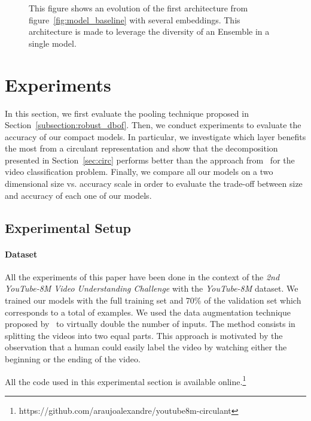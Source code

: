 \documentclass[runningheads]{llncs}
\newcommand{\yt}{\textit{YouTube-8M}\xspace}
\begin{document}
\begin{figure}[ht]
  \centering
  \scalebox{.75}{}
  \caption{This figure shows an evolution of the first architecture from figure~\ref{fig:model_baseline} with several embeddings. This architecture is made to leverage the diversity of an Ensemble in a single model.}
  \label{fig:diverstiy_architecture}
\end{figure}



\section{Experiments}
\label{sec:xp}

In this section, we first evaluate the pooling technique proposed in Section~\ref{subsection:robust_dbof}. Then, we conduct experiments to evaluate the accuracy of our compact models. In particular, we investigate which layer benefits the most from a circulant representation and show that the decomposition presented in Section~\ref{sec:circ} performs better than the  approach from~\cite{7410684} for the video classification problem. Finally, we compare all our models on a two dimensional size vs. accuracy scale in order to evaluate the trade-off between size and accuracy of each one of our models.


\subsection{Experimental Setup}
\paragraph*{\textbf{Dataset}}
All the experiments of this paper have been done in the context of the \textit{2nd YouTube-8M Video Understanding Challenge} with the \yt dataset. We trained our models with the full training set and 70\% of the validation set which corresponds to a total of  examples. We used the data augmentation technique proposed by~\cite{skalic2017deep} to virtually double the number of inputs.
The method consists in splitting the videos into two equal parts. This approach is motivated by the observation  that a human could easily label the video by watching either the beginning or the ending of the video.

All the code used in this experimental section is available online.\footnote{https://github.com/araujoalexandre/youtube8m-circulant}
\end{document}

